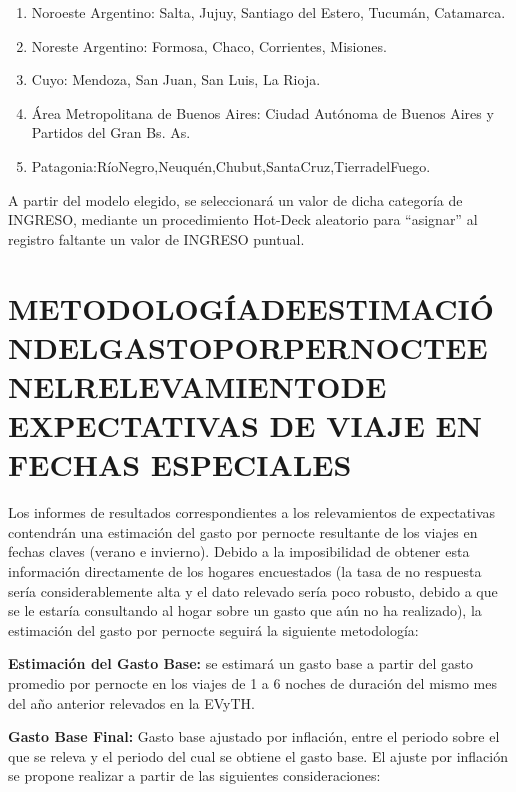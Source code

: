 \documentclass[
  openany]{book}
\begin{document}
\begin{enumerate}
\def\labelenumi{\arabic{enumi}.}
\item
  Noroeste Argentino: Salta, Jujuy, Santiago del Estero, Tucumán, Catamarca.
\item
  Noreste Argentino: Formosa, Chaco, Corrientes, Misiones.
\item
  Cuyo: Mendoza, San Juan, San Luis, La Rioja.
\item
  Área Metropolitana de Buenos Aires: Ciudad Autónoma de Buenos Aires y Partidos del Gran Bs. As.
\item
  Patagonia:RíoNegro,Neuquén,Chubut,SantaCruz,TierradelFuego.
\end{enumerate}

A partir del modelo elegido, se seleccionará un valor de dicha categoría de INGRESO, mediante un procedimiento Hot-Deck aleatorio para ``asignar'' al registro faltante un valor de INGRESO puntual.

\hypertarget{metodologuxedadeestimaciuxf3ndelgastoporpernocteenelrelevamientode-expectativas-de-viaje-en-fechas-especiales}{%
\section{\texorpdfstring{\textbf{METODOLOGÍADEESTIMACIÓNDELGASTOPORPERNOCTEENELRELEVAMIENTODE EXPECTATIVAS DE VIAJE EN FECHAS ESPECIALES}}{METODOLOGÍADEESTIMACIÓNDELGASTOPORPERNOCTEENELRELEVAMIENTODE EXPECTATIVAS DE VIAJE EN FECHAS ESPECIALES}}\label{metodologuxedadeestimaciuxf3ndelgastoporpernocteenelrelevamientode-expectativas-de-viaje-en-fechas-especiales}}

Los informes de resultados correspondientes a los relevamientos de expectativas contendrán una estimación del gasto por pernocte resultante de los viajes en fechas claves (verano e invierno). Debido a la imposibilidad de obtener esta información directamente de los hogares encuestados (la tasa de no respuesta sería considerablemente alta y el dato relevado sería poco robusto, debido a que se le estaría consultando al hogar sobre un gasto que aún no ha realizado), la estimación del gasto por pernocte seguirá la siguiente metodología:

\textbf{Estimación del Gasto Base:} se estimará un gasto base a partir del gasto promedio por pernocte en los viajes de 1 a 6 noches de duración del mismo mes del año anterior relevados en la EVyTH.

\textbf{Gasto Base Final:} Gasto base ajustado por inflación, entre el periodo sobre el que se releva y el periodo del cual se obtiene el gasto base. El ajuste por inflación se propone realizar a partir de las siguientes consideraciones:
\end{document}

